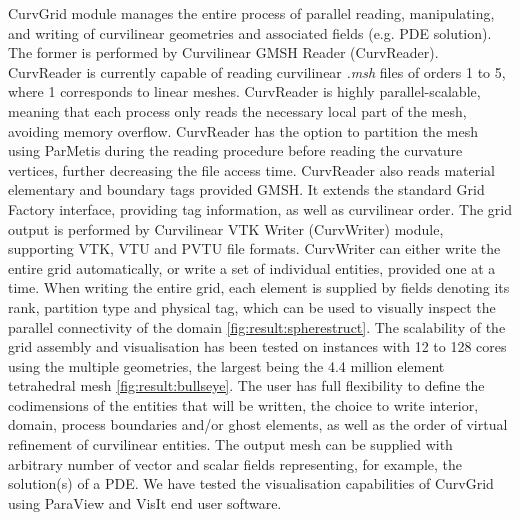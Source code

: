 \noindent
CurvGrid module manages the entire process of parallel reading, manipulating, and writing of curvilinear geometries and associated fields (e.g. PDE solution). The former is performed by Curvilinear GMSH Reader (CurvReader). CurvReader is currently capable of reading curvilinear \textit{.msh} files of orders 1 to 5, where 1 corresponds to linear meshes. CurvReader is highly parallel-scalable, meaning that each process only reads the necessary local part of the mesh, avoiding memory overflow. CurvReader has the option to partition the mesh using ParMetis during the reading procedure before reading the curvature vertices, further decreasing the file access time. CurvReader also reads material elementary and boundary tags provided GMSH. It extends the standard Grid Factory interface, providing tag information, as well as curvilinear order. The grid output is performed by Curvilinear VTK Writer (CurvWriter) module, supporting VTK, VTU and PVTU file formats. CurvWriter can either write the entire grid automatically, or write a set of individual entities, provided one at a time. When writing the entire grid, each element is supplied by fields denoting its rank, partition type and physical tag, which can be used to visually inspect the parallel connectivity of the domain \cref{fig:result:spherestruct}. The scalability of the grid assembly and visualisation has been tested on instances with 12 to 128 cores using the multiple geometries, the largest being the 4.4 million element tetrahedral mesh \cref{fig:result:bullseye}. The user has full flexibility to define the codimensions of the entities that will be written, the choice to write interior, domain, process boundaries and/or ghost elements, as well as the order of virtual refinement of curvilinear entities. The output mesh can be supplied with arbitrary number of vector and scalar fields representing, for example, the solution(s) of a PDE. We have tested the visualisation capabilities of CurvGrid using ParaView \cite{johnson+2005} and VisIt \cite{childs+2012} end user software. \\

